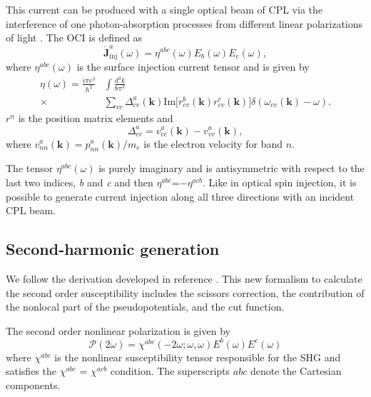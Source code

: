 \documentclass[pss]{wiley2sp} %
\begin{document}
This current can be produced with a single optical beam of CPL via the interference of one photon-absorption processes from different linear polarizations of light \cite{sipePRB00}. The  OCI is defined as
\begin{equation}
\mathbf{\dot{J}}^{a}_{\text{inj}}(\omega) =
\eta^{abc}(\omega)E_{b}(\omega)E_{c}(\omega), \label{eq:eta}
\end{equation}
where $\eta^{abc}(\omega)$ is the surface injection current tensor and is given by
\begin{align*}
\eta(\omega) =  \frac{i\pi e^{3}}{\hbar^{2}}&\int\frac{d^{3}k}{8\pi^{3}}
\nonumber \\
\times &
\sum_{vc}\Delta^{a}_{cv}(\mathbf{k})\text{Im}\big[r^{b}_{cv}(\mathbf{k})
r^{c}_{cv}(\mathbf{k})\big]\delta(\omega_{cv}(\mathbf{k})-\omega).
\end{align*}
$r^{n}$ is the position matrix elements and 
\begin{equation*}
\Delta^{a}_{cv} = v^{a}_{cc}(\mathbf{k})-v^{a}_{vv}(\mathbf{k}),
\end{equation*}
where $v^{a}_{nn}(\mathbf{k})=p^{a}_{nn}(\mathbf{k})/m_{e}$ is the electron velocity for band $n$.

The tensor $\eta^{abc}(\omega)$ is purely imaginary and is antisymmetric with respect to the last two indices, \emph{b} and \emph{c} \cite{sipePRB00,nastosPRB06} and then $\eta^{abc}$=$-\eta^{acb}$. Like in optical spin injection, it is possible to generate current injection along all three directions with an incident CPL beam.


\subsection{Second-harmonic generation}\label{sec:theory-SHG}

We follow the derivation developed in reference \cite{andersonPRB15}. This new formalism to calculate the second order susceptibility includes the scissors correction, the contribution of the nonlocal part of the pseudopotentials, and the cut function. 

The second order nonlinear polarization is given by 
\begin{equation*}
\mathcal{P}(2\omega) = \chi^{abc}(-2\omega;\omega,\omega)E^{b}(\omega)E^{c}(\omega)
\end{equation*}
where $\chi^{abc}$ is the nonlinear susceptibility tensor responsible for the SHG and satisfies the $\chi^{abc}$ = $\chi^{acb}$ condition. The superscripts $abc$ denote the Cartesian components.  
\end{document}

